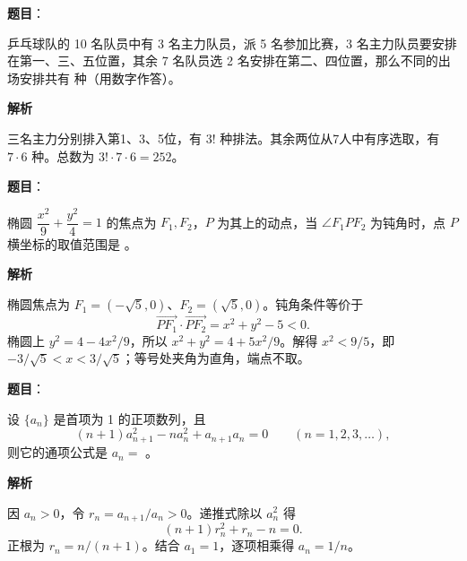 \begin{answer}

\textbf{题目}：

乒乓球队的 10 名队员中有 3 名主力队员，派 5 名参加比赛，3 名主力队员要安排在第一、三、五位置，其余 7 名队员选 2 名安排在第二、四位置，那么不同的出场安排共有 \gkblank{} 种（用数字作答）。

\textbf{解析}

三名主力分别排入第1、3、5位，有 $3!$ 种排法。其余两位从7人中有序选取，有 $7\cdot6$ 种。总数为 $3!\cdot7\cdot6=252$。


\end{answer}
\begin{answer}

\textbf{题目}：

椭圆 $\dfrac{x^2}{9}+\dfrac{y^2}{4}=1$ 的焦点为 $F_1,F_2$，$P$ 为其上的动点，当 $\angle F_1PF_2$ 为钝角时，点 $P$ 横坐标的取值范围是 \gkblank{}。

\textbf{解析}

椭圆焦点为 $F_1=(-\sqrt5,0)$、$F_2=(\sqrt5,0)$。钝角条件等价于
\nopagebreak[4]
\[
\overrightarrow{PF_1}\cdot\overrightarrow{PF_2}=x^2+y^2-5<0.
\]
椭圆上 $y^2=4-4x^2/9$，所以 $x^2+y^2=4+5x^2/9$。解得 $x^2<9/5$，即 $-3/\sqrt5<x<3/\sqrt5$；等号处夹角为直角，端点不取。


\end{answer}
\begin{answer}

\textbf{题目}：

设 $\{a_n\}$ 是首项为 1 的正项数列，且
\nopagebreak[4]
\[
(n+1)a_{n+1}^{2}-na_n^{2}+a_{n+1}a_n=0\qquad(n=1,2,3,\ldots),
\]
则它的通项公式是 $a_n=$ \gkblank{}。

\textbf{解析}

因 $a_n>0$，令 $r_n=a_{n+1}/a_n>0$。递推式除以 $a_n^2$ 得
\nopagebreak[4]
\[
(n+1)r_n^2+r_n-n=0.
\]
正根为 $r_n=n/(n+1)$。结合 $a_1=1$，逐项相乘得 $a_n=1/n$。


\end{answer}
